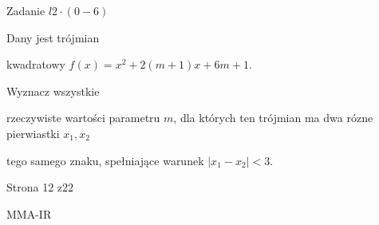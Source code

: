 \documentclass[a4paper,12pt]{article}
\begin{document}
Zadanie $l2\cdot(0-6)$

Dany jest trójmian

kwadratowy $f(x)=x^{2}+2(m+1)x+6m+1.$

Wyznacz wszystkie

rzeczywiste wartości parametru $m$, dla których ten trójmian ma dwa rózne pierwiastki $x_{1}, x_{2}$

tego samego znaku, spełniające warunek $|x_{1}-x_{2}|<3.$

Strona 12 z22

MMA-IR
\end{document}
